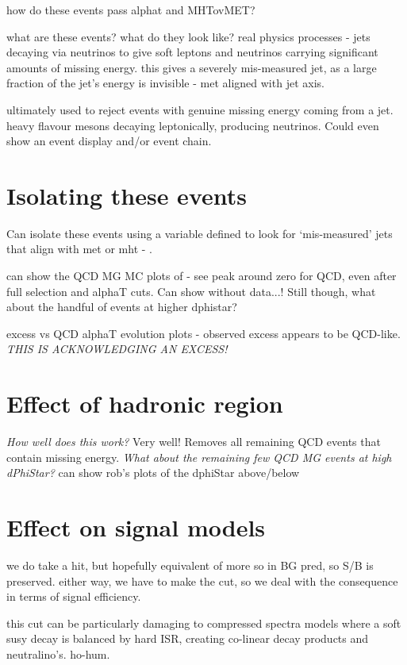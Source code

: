 how do these events pass alphat and MHTovMET?

what are these events? what do they look like? real physics processes - jets
decaying via neutrinos to give soft leptons and neutrinos carrying significant
amounts of missing energy. this gives a severely mis-measured jet, as a
large fraction of the jet's energy is invisible - met aligned with jet axis.

ultimately used to reject events with genuine missing energy coming from a jet.
heavy flavour mesons decaying leptonically, producing neutrinos. Could even show
an event display and/or event chain.

\section{Isolating these events}

Can isolate these events using a variable defined to look for `mis-measured'
jets that align with met or mht - \mindphistar.

can show the QCD MG MC plots of \dphistar - see peak around zero for QCD, even
after full selection and alphaT cuts. Can show without data...! Still though,
what about the handful of events at higher dphistar?

excess vs QCD alphaT evolution plots - observed excess appears to be QCD-like.
\emph{THIS IS ACKNOWLEDGING AN EXCESS!}

\section{Effect of hadronic region}

\emph{How well does this work?} Very well! Removes all remaining QCD events that
contain missing energy. \emph{What about the remaining few QCD MG events at high
dPhiStar?} can show rob's plots of the dphiStar above/below

\section{Effect on signal models}
we do take a hit, but hopefully equivalent of more so in BG pred, so S/B is
preserved. either way, we have to make the cut, so we deal with the consequence
in terms of signal efficiency.

this cut can be particularly damaging to compressed spectra models where a
soft susy decay is balanced by hard ISR, creating co-linear decay products and
neutralino's. ho-hum.

